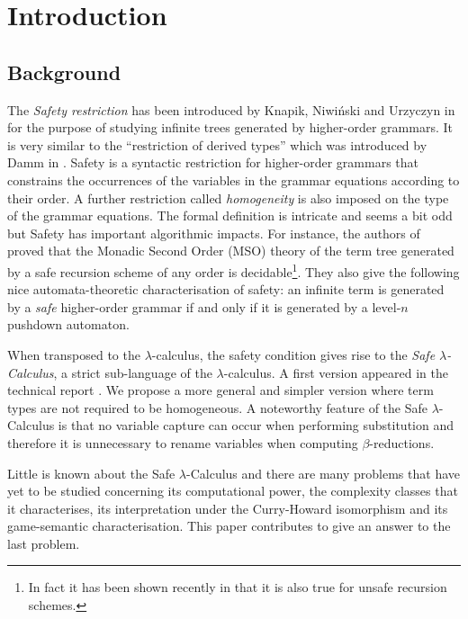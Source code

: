 \documentclass{llncs}
\begin{document}
\section{Introduction}

\subsection{Background}

The \emph{Safety restriction} has been introduced by Knapik, Niwi{\'n}ski and Urzyczyn in \cite{KNU02}
for the purpose of studying infinite trees generated by higher-order grammars.
It is very similar to the ``restriction of derived types'' which was introduced
by Damm in \cite{Dam82}.
Safety is a syntactic restriction for higher-order grammars that
constrains the occurrences of the variables in the grammar
equations according to their order. A further restriction called \emph{homogeneity} is also imposed on the type of the grammar equations.
The formal definition is intricate and seems a bit odd but Safety has important algorithmic impacts.
For instance, the authors of \cite{KNU02} proved that the Monadic Second
Order (MSO) theory of the term tree generated by a safe recursion
scheme of any order is decidable\footnote{In fact it has been shown
recently in \cite{OngLics2006} that it is also true for unsafe
recursion schemes.}. They also give the following nice automata-theoretic characterisation of safety:
an infinite term is generated by a \emph{safe} higher-order grammar if and only if
it is generated by a level-$n$ pushdown automaton.


When transposed to the $\lambda$-calculus, the safety condition
gives rise to the \emph{Safe $\lambda$-Calculus}, a strict
sub-language of the $\lambda$-calculus. A first version appeared in
the technical report \cite{safety-mirlong2004}. We propose a more
general and simpler version where term types are not required to be
homogeneous. A noteworthy feature of the Safe
$\lambda$-Calculus is that no variable capture can occur when
performing substitution and therefore it is unnecessary to rename
variables when computing $\beta$-reductions.

Little is known about the Safe $\lambda$-Calculus and there are many
problems that have yet to be studied concerning its
computational power, the complexity classes that it characterises,
its interpretation under the Curry-Howard isomorphism and its
game-semantic characterisation. This paper contributes to give an
answer to the last problem.
\end{document}
